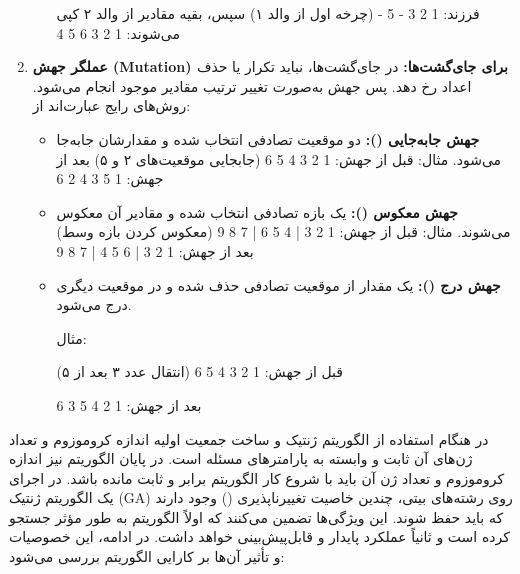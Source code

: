 \documentclass[12pt]{exam}
\begin{document}
\begin{questions}
\begin{parts}
\begin{enumerate}
\begin{itemize}
			فرزند: 1 2 3 - 5 -  (چرخه اول از والد ۱)
			سپس، بقیه مقادیر از والد ۲ کپی می‌شوند: 1 2 3 6 5 4
			
			
		\end{itemize}
		\item \textbf{عملگر جهش (Mutation) برای جای‌گشت‌ها:}
		در جای‌گشت‌ها، نباید تکرار یا حذف اعداد رخ دهد. پس جهش به‌صورت تغییر ترتیب مقادیر موجود انجام می‌شود. روش‌های رایج عبارت‌اند از:
		
		\begin{itemize}
			\item \textbf{جهش جابه‌جایی ():}
			دو موقعیت تصادفی انتخاب شده و مقدارشان جابه‌جا می‌شود.
			\newline
			مثال:
			\newline
			قبل از جهش: 1 2 3 4 5 6   (جابجایی موقعیت‌های ۲ و ۵)
			\newline
	بعد از جهش: 1 5 3 4 2 6
			\item \textbf{جهش معکوس ():}
			یک بازه تصادفی انتخاب شده و مقادیر آن معکوس می‌شوند.
			\newline
			مثال:
			\newline
			قبل از جهش: 1 2 3 | 4 5 6 | 7 8 9  (معکوس کردن بازه وسط)
			\newline
			بعد از جهش: 1 2 3 | 6 5 4 | 7 8 9
			
			\item \textbf{جهش درج ():}
			یک مقدار از موقعیت تصادفی حذف شده و در موقعیت دیگری درج می‌شود.
			
			مثال:
			
			قبل از جهش: 1 2 3 4 5 6  (انتقال عدد ۳ بعد از ۵)
			
			بعد از جهش: 1 2 4 5 3 6
			
		\end{itemize}
	\end{enumerate}
	\end{parts}
	
	\question
	در هنگام استفاده از الگوریتم ژنتیک و ساخت جمعیت اولیه اندازه کروموزوم و تعداد ژن‌های آن ثابت و وابسته به پارامترهای مسئله است. در پایان الگوریتم نیز اندازه کروموزوم و تعداد ژن آن باید با شروع کار الگوریتم برابر و ثابت مانده باشد. در اجرای یک الگوریتم ژنتیک (GA) روی رشته‌های بیتی، چندین خاصیت تغییرناپذیری
	 () وجود دارند که باید حفظ شوند. این ویژگی‌ها تضمین می‌کنند که اولاً الگوریتم به طور مؤثر جستجو کرده است و ثانیاً عملکرد پایدار و قابل‌پیش‌بینی خواهد داشت. در ادامه، این خصوصیات و تأثیر آن‌ها بر کارایی الگوریتم بررسی می‌شود:
	 

\end{questions}
\end{document}
